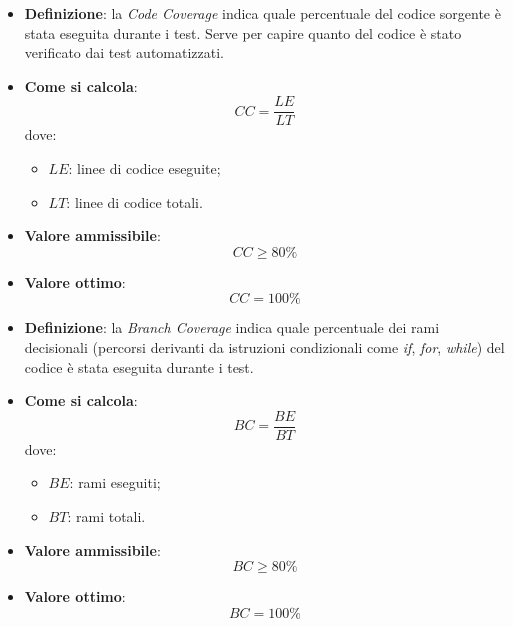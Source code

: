 \hypertarget{26M}{}
\begin{itemize}
	\item \textbf{Definizione}: la \textit{Code Coverage} indica quale percentuale del codice sorgente è stata eseguita durante i test. Serve per capire quanto del codice è stato verificato dai test automatizzati.
	\item \textbf{Come si calcola}: \begin{equation*}CC = \frac{LE}{LT}\end{equation*} dove:
		\begin{itemize}
			\item $LE$: linee di codice eseguite;
			\item $LT$: linee di codice totali.
		\end{itemize}
	\item \textbf{Valore ammissibile}: \begin{equation*}CC \geq 80\%\end{equation*}
	\item \textbf{Valore ottimo}: \begin{equation*}CC = 100\%\end{equation*}
\end{itemize}

\hypertarget{27M}{}
\begin{itemize}
	\item \textbf{Definizione}: la \textit{Branch Coverage} indica quale percentuale dei rami decisionali (percorsi derivanti da istruzioni condizionali come \textit{if}, \textit{for}, \textit{while}) del codice è stata eseguita durante i test.
	\item \textbf{Come si calcola}: \begin{equation*}BC = \frac{BE}{BT}\end{equation*} dove:
		\begin{itemize}
			\item $BE$: rami eseguiti;
			\item $BT$: rami totali.
		\end{itemize}
	\item \textbf{Valore ammissibile}: \begin{equation*}BC \geq 80\%\end{equation*}
	\item \textbf{Valore ottimo}: \begin{equation*}BC = 100\%\end{equation*}
\end{itemize}

